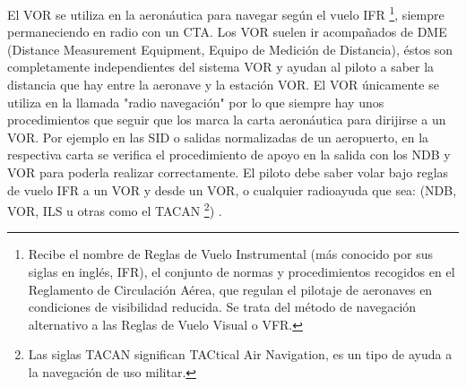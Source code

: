 El VOR se utiliza en la aeronáutica para navegar según el vuelo IFR \footnote{Recibe el nombre de Reglas de Vuelo Instrumental (más conocido por sus siglas en inglés, IFR), el conjunto de normas y procedimientos recogidos en el Reglamento de Circulación Aérea, que regulan el pilotaje de aeronaves en condiciones de visibilidad reducida. Se trata del método de navegación alternativo a las Reglas de Vuelo Visual o VFR.}, siempre permaneciendo en radio con un CTA. Los VOR suelen ir acompañados de DME (Distance Measurement Equipment, Equipo de Medición de Distancia), éstos son completamente independientes del sistema VOR y ayudan al piloto a saber la distancia que hay entre la aeronave y la estación VOR. El VOR únicamente se utiliza en la llamada "radio navegación" por lo que siempre hay unos procedimientos que seguir que los marca la carta aeronáutica para dirijirse a un VOR. Por ejemplo en las SID o salidas normalizadas de un aeropuerto, en la respectiva carta se verifica el procedimiento de apoyo en la salida con los NDB y VOR para poderla realizar correctamente. El piloto debe saber volar bajo reglas de vuelo IFR a un VOR y desde un VOR, o cualquier radioayuda que sea: (NDB, VOR, ILS u otras como el TACAN \footnote{Las siglas TACAN significan  TACtical Air Navigation,  es un tipo de ayuda a la navegación de uso militar.}) \cite{VOR-Wikipedia}.

